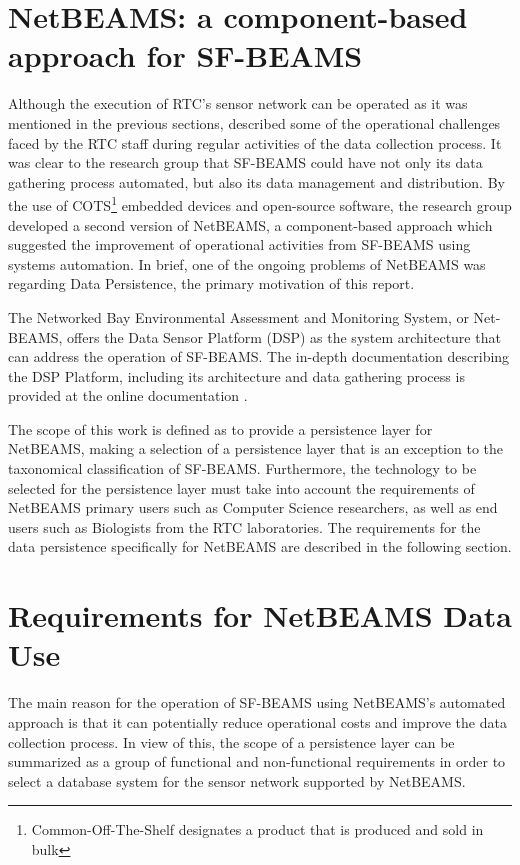 \section{NetBEAMS: a component-based approach for SF-BEAMS}
\label{sec:problem-requirements}

Although the execution of RTC's sensor network can be operated as it
was mentioned in the previous sections, \cite{netbeams2009} described some of the
operational challenges faced by the RTC staff during regular activities of the
data collection process. It was clear to the research group that SF-BEAMS
could have not only its data gathering process automated, but also its data
management and distribution. By the use of COTS\footnote{Common-Off-The-Shelf
designates a product that is produced and sold in bulk} embedded devices and
open-source \cite{open-source} software, the research group developed a second
version of NetBEAMS, a component-based approach which suggested the improvement of 
operational activities from SF-BEAMS using systems automation. In brief, one of the 
ongoing problems of NetBEAMS was regarding Data Persistence, the primary motivation of
this report.

The Networked Bay Environmental Assessment and Monitoring System, or Net-BEAMS,
offers the Data Sensor Platform (DSP) \cite{netbeams2009} as the system
architecture that can address the operation of SF-BEAMS. The in-depth
documentation describing the DSP Platform, including its architecture and data
gathering process is provided at the online documentation 
\cite{netbeams-dsp-architecture}.

The scope of this work is defined as to provide a persistence layer for
NetBEAMS, making a selection of a persistence layer that is an exception to the
taxonomical classification of SF-BEAMS. Furthermore, the technology to be
selected for the persistence layer must take into account the requirements of
NetBEAMS primary users such as Computer Science researchers, as well as end
users such as Biologists from the RTC laboratories. The requirements for the
data persistence specifically for NetBEAMS are described in the following
section.

\section{Requirements for NetBEAMS Data Use}

The main reason for the operation of SF-BEAMS using NetBEAMS's automated
approach is that it can potentially reduce operational costs and improve the
data collection process. In view of this, the scope of a persistence layer
can be summarized as a group of functional and non-functional requirements in
order to select a database system for the sensor network supported by NetBEAMS.

